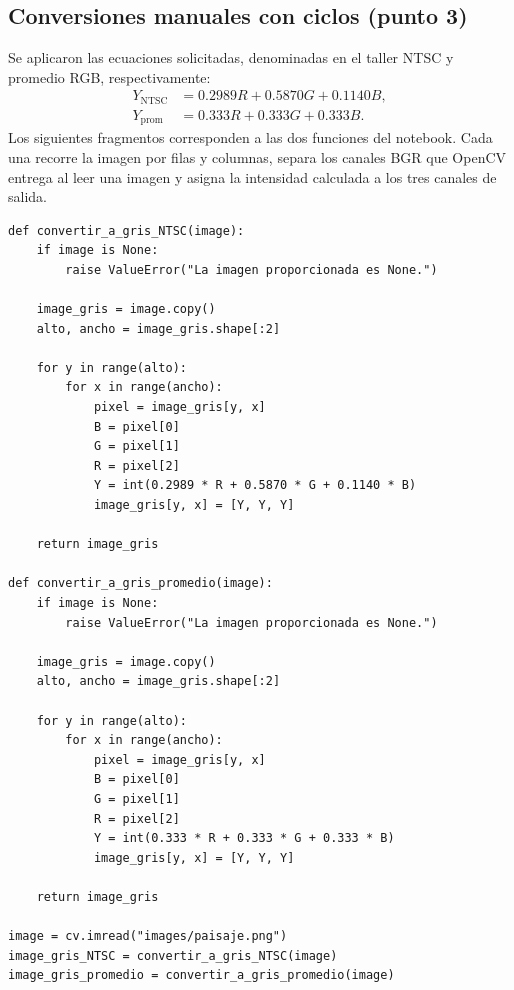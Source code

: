 \documentclass[11pt,a4paper]{article}
\begin{document}
\subsection{Conversiones manuales con ciclos (punto 3)}
Se aplicaron las ecuaciones solicitadas, denominadas en el taller NTSC
y promedio RGB, respectivamente:
\begin{align}
Y_{\mathrm{NTSC}} &= 0.2989R + 0.5870G + 0.1140B,\label{eq:ntsc}\\
Y_{\mathrm{prom}} &= 0.333R + 0.333G + 0.333B.\label{eq:prom}
\end{align}
Los siguientes fragmentos corresponden a las dos funciones del notebook.
Cada una recorre la imagen por filas y columnas, separa los canales BGR
que OpenCV entrega al leer una imagen y asigna la intensidad calculada a
los tres canales de salida.
\begin{lstlisting}
def convertir_a_gris_NTSC(image):
    if image is None:
        raise ValueError("La imagen proporcionada es None.")

    image_gris = image.copy()
    alto, ancho = image_gris.shape[:2]

    for y in range(alto):
        for x in range(ancho):
            pixel = image_gris[y, x]
            B = pixel[0]
            G = pixel[1]
            R = pixel[2]
            Y = int(0.2989 * R + 0.5870 * G + 0.1140 * B)
            image_gris[y, x] = [Y, Y, Y]

    return image_gris

def convertir_a_gris_promedio(image):
    if image is None:
        raise ValueError("La imagen proporcionada es None.")

    image_gris = image.copy()
    alto, ancho = image_gris.shape[:2]

    for y in range(alto):
        for x in range(ancho):
            pixel = image_gris[y, x]
            B = pixel[0]
            G = pixel[1]
            R = pixel[2]
            Y = int(0.333 * R + 0.333 * G + 0.333 * B)
            image_gris[y, x] = [Y, Y, Y]

    return image_gris

image = cv.imread("images/paisaje.png")
image_gris_NTSC = convertir_a_gris_NTSC(image)
image_gris_promedio = convertir_a_gris_promedio(image)
\end{lstlisting}
\end{document}
